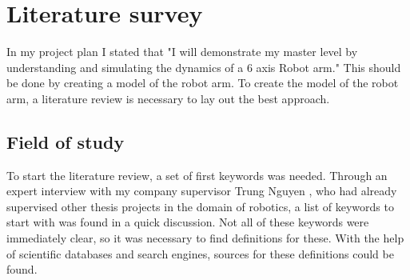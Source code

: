 \chapter{Literature survey}

In my project plan I stated that "I will demonstrate my master level by understanding and simulating the dynamics of a 6 axis Robot arm."\cite{ProjectPlan}
This should be done by creating a model of the robot arm. 
To create the model of the robot arm, a literature review is necessary to lay out the best approach.\\
\medskip

\section{Field of study}

To start the literature review, a set of first keywords was needed. Through an expert interview with my company supervisor Trung Nguyen \cite{Trung} , who had already supervised other thesis projects in the domain of robotics, a list of keywords to start with was found in a quick discussion. Not all of these keywords were immediately clear, so it was necessary to find definitions for these. With the help of scientific databases and search engines, sources for these definitions could be found.\\




